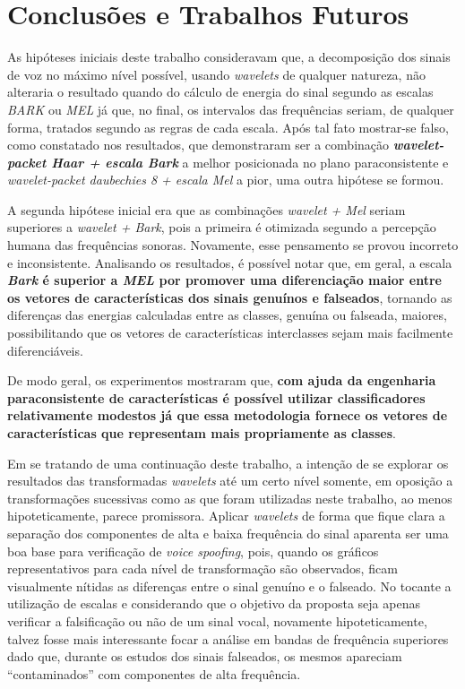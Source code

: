 \chapter{Conclusões e Trabalhos Futuros} \label{chap:conclusions}
	\par As hipóteses iniciais deste trabalho consideravam que, a decomposição dos sinais de voz no máximo nível possível, usando \textit{wavelets} de qualquer natureza, não alteraria o resultado quando do cálculo de energia do sinal segundo as escalas \textit{BARK} ou \textit{MEL} já que, no final, os intervalos das frequências seriam, de qualquer forma, tratados segundo as regras de cada escala. Após tal fato mostrar-se falso, como constatado nos resultados, que demonstraram ser a combinação \textbf{\textit{wavelet-packet Haar + escala Bark}} a melhor posicionada no plano paraconsistente e \textit{wavelet-packet daubechies 8 + escala Mel} a pior, uma outra hipótese se formou.
	
	\par A segunda hipótese inicial era que as combinações \textit{wavelet + Mel} seriam superiores a \textit{wavelet + Bark}, pois a primeira é otimizada segundo a percepção humana das frequências sonoras. Novamente, esse pensamento se provou incorreto e inconsistente. Analisando os resultados, é possível notar que, em geral, a escala \textbf{\textit{Bark} é superior a \textit{MEL} por promover uma diferenciação maior entre os vetores de características dos sinais genuínos e falseados}, tornando as diferenças das energias calculadas entre as classes, genuína ou falseada, maiores, possibilitando que os vetores de características interclasses sejam mais facilmente diferenciáveis.

    \par De modo geral, os experimentos mostraram que, \textbf{com ajuda da engenharia paraconsistente de características é possível utilizar classificadores relativamente modestos já que essa metodologia fornece os vetores de características que representam mais propriamente as classes}.
   
    \par Em se tratando de uma continuação deste trabalho, a intenção de se explorar os resultados das transformadas \textit{wavelets} até um certo nível somente, em oposição a transformações sucessivas como as que foram utilizadas neste trabalho, ao menos hipoteticamente, parece promissora. Aplicar \textit{wavelets} de forma que fique clara a separação dos componentes de alta e baixa frequência do sinal aparenta ser uma boa base para verificação de \textit{voice spoofing}, pois, quando os gráficos representativos para cada nível de transformação são observados, ficam visualmente nítidas as diferenças entre o sinal genuíno e o falseado. No tocante a utilização de escalas e considerando que o objetivo da proposta seja apenas verificar a falsificação ou não de um sinal vocal, novamente hipoteticamente, talvez fosse mais interessante focar a análise em bandas de frequência superiores dado que, durante os estudos dos sinais falseados, os mesmos apareciam 
   ``contaminados'' com componentes de alta frequência.